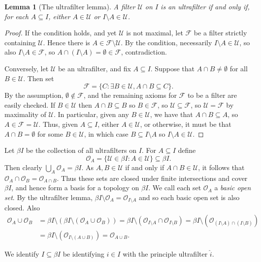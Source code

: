 \documentclass[a4paper,12pt]{article}
\theoremstyle{plain}
\newtheorem{lemma}[proposition]{Lemma}
\theoremstyle{definition}
\newcommand{\mc}[1]{\mathcal{#1}}
\begin{document}
\begin{lemma}[The ultrafilter lemma]
A filter $\mc U$ on $I$ is an ultrafilter if and only if, for each $A\subseteq I$, either $A\in\mc U$
or $I\setminus A\in \mc U$.
\end{lemma}
\begin{proof}
If the condition holds, and yet $\mc U$ is not maximal, let $\mc F$ be a filter strictly containing $\mc U$.
Hence there is $A\in \mc F \setminus\mc U$.  By the condition, necessarily $I\setminus A\in\mc U$, so
also $I\setminus A\in\mc F$, so $A \cap (I\setminus A) = \emptyset \in \mc F$, contradiction.

Conversely, let $\mc U$ be an ultrafilter, and fix $A\subseteq I$.  Suppose that $A\cap B\not=\emptyset$
for all $B\in\mc U$.  Then set
\[ \mc F = \{ C : \exists B\in\mc U, A \cap B \subseteq C \}. \]
By the assumption, $\emptyset\not\in \mc F$, and the remaining axioms for $\mc F$ to be a filter are
easily checked.  If $B\in\mc U$ then $A\cap B \subseteq B$ so $B\in\mc F$, so $\mc U\subseteq\mc F$, so
$\mc U=\mc F$ by maximality of $\mc U$.  In particular, given any $B\in\mc U$, we have that $A\cap B
\subseteq A$, so $A\in\mc F=\mc U$.  Thus, given $A\subseteq I$, either $A\in\mc U$, or otherwise, it
must be that $A\cap B=\emptyset$ for some $B\in\mc U$, in which case $B \subseteq I\setminus A$ so
$I\setminus A\in\mc U$.
\end{proof}

Let $\beta I$ be the collection of all ultrafilters on $I$.  For $A\subseteq I$ define
\[ \mc O_A = \{ \mc U\in\beta I : A\in\mc U \} \subseteq \beta I. \]
Then clearly $\bigcup_A \mc O_A = \beta I$.  As $A,B\in\mc U$ if and only if $A\cap B\in\mc U$, it follows
that $\mc O_A \cap \mc O_B = \mc O_{A\cap B}$.  Thus these sets are closed under finite intersections
and cover $\beta I$, and hence form a basis for a topology on $\beta I$.  We call each set $\mc O_A$ a
\emph{basic open set}.  By the ultrafilter lemma, $\beta I \setminus \mc O_A = \mc O_{I\setminus A}$
and so each basic open set is also closed.  Also
\begin{align*}
\mc O_A \cup \mc O_B &= \beta I\setminus(\beta I\setminus(\mc O_A \cup \mc O_B))
= \beta I\setminus( \mc O_{I\setminus A} \cap \mc O_{I\setminus B} )
= \beta I\setminus( \mc O_{(I\setminus A) \cap (I\setminus B)} ) \\
&= \beta I\setminus( \mc O_{I \setminus (A\cup B)} )
= \mc O_{A\cup B}.
\end{align*}

We identify $I\subseteq\beta I$ be identifying $i\in I$ with the principle ultrafilter $\hat i$.
\end{document}
